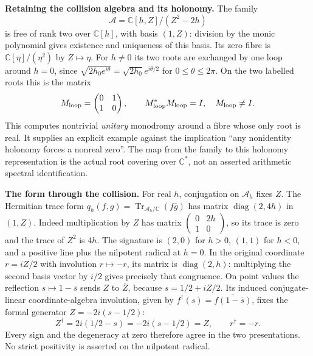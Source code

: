 \documentclass[11pt,a4paper]{article}
\theoremstyle{definition}\newtheorem{definition}[theorem]{Definition}
\begin{document}
\EH\textbf{Retaining the collision algebra and its holonomy.}
The family
\[
 \mathcal A=\mathbb C[h,Z]/(Z^2-2h)
\]
is free of rank two over $\mathbb C[h]$, with basis $(1,Z)$: division
by the monic polynomial gives existence and uniqueness of this basis.
Its zero fibre is $\mathbb C[\eta]/(\eta^2)$ by $Z\mapsto\eta$.
For $h\ne0$ its two roots are exchanged by one loop around $h=0$,
since $\sqrt{2h_0e^{i\theta}}=\sqrt{2h_0}e^{i\theta/2}$ for
$0\le\theta\le2\pi$. On the two labelled roots this is the matrix
\[
 M_{\rm loop}=\begin{pmatrix}0&1\\1&0\end{pmatrix},\qquad
 M_{\rm loop}^*M_{\rm loop}=I,\quad M_{\rm loop}\ne I.
\]
This computes nontrivial \emph{unitary} monodromy around a fibre whose
only root is real. It supplies an explicit example against the implication
``any nonidentity holonomy forces a nonreal zero''. The map from the
family to this holonomy representation is the actual root covering over
$\mathbb C^*$, not an asserted arithmetic spectral identification.

\EH\textbf{The form through the collision.}
For real $h$, conjugation on $\mathcal A_h$ fixes $Z$. The Hermitian
trace form $q_h(f,g)=\operatorname{Tr}_{\mathcal A_h/\mathbb C}
(f\overline g)$ has matrix $\operatorname{diag}(2,4h)$ in $(1,Z)$.
Indeed multiplication by $Z$ has matrix
$\left(\begin{smallmatrix}0&2h\\1&0\end{smallmatrix}\right)$,
so its trace is zero and the trace of $Z^2$ is $4h$.
The signature is $(2,0)$ for $h>0$, $(1,1)$ for $h<0$, and a positive
line plus the nilpotent radical at $h=0$. In the original coordinate
$r=iZ/2$ with involution $r\mapsto-r$, its matrix is
$\operatorname{diag}(2,h)$: multiplying the second basis vector by
$i/2$ gives precisely that congruence. On point values the reflection
$s\mapsto1-\overline s$ sends $Z$ to $\overline Z$, because
$s=1/2+iZ/2$. Its induced conjugate-linear coordinate-algebra
involution, given by $f^\dagger(s)=\overline{f(1-\overline s)}$,
fixes the formal generator $Z=-2i(s-1/2)$:
\[
 Z^\dagger=2i(1/2-s)=-2i(s-1/2)=Z,
 \qquad r^\dagger=-r.
\]
Every sign and the degeneracy at zero therefore agree in the two
presentations. No strict positivity is asserted on the nilpotent radical.
\end{document}
